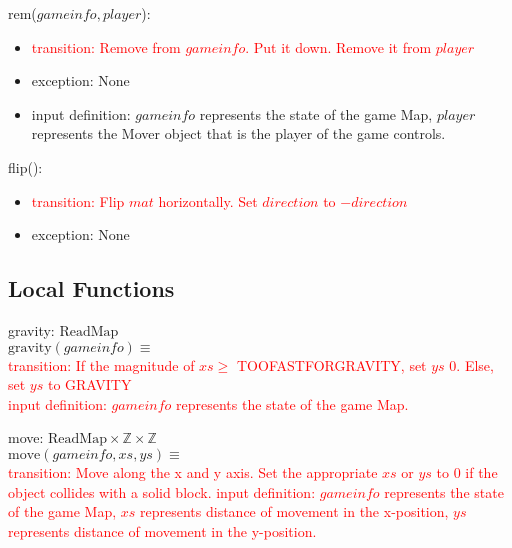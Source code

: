 \documentclass[12pt]{article}
\newcommand{\Implies}{\Rightarrow}
\newcommand{\m}[1]{\mbox{#1}}
\begin{document}
\noindent rem($gameinfo, player$):
\begin{itemize}
    \item \textcolor{red}{transition: Remove from $gameinfo$. Put it down. Remove it from $player$ }
    \item exception: None
    \item input definition: $gameinfo$ represents the state of the game Map, $player$ represents the Mover object that is the player of the game controls.
\end{itemize}

\noindent flip():
\begin{itemize}
    \item \textcolor{red}{transition: Flip $mat$ horizontally. Set $direction$ to $-direction$}
    \item exception: None
\end{itemize}

\subsection*{Local Functions}

\noindent gravity: $\m{ReadMap}$\\
$\m{gravity}(gameinfo) \equiv$\\
\textcolor{red}{transition: If the magnitude of $xs \geq$ TOOFASTFORGRAVITY, set $ys$ 0. Else, set $ys$ to GRAVITY\\
input definition: $gameinfo$ represents the state of the game Map.}

\noindent move: $\m{ReadMap} \times \mathbb{Z} \times \mathbb{Z}$\\
$\m{move}(gameinfo, xs, ys) \equiv$\\
\textcolor{red}{transition: Move along the x and y axis. Set the appropriate $xs$ or $ys$ to $0$ if the object collides with a solid block.
input definition: $gameinfo$ represents the state of the game Map, $xs$ represents distance of movement in the x-position, $ys$ represents distance of movement in the y-position.}
\end{document}
